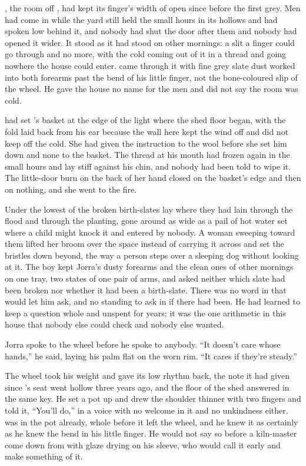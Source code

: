 
, the room off , had kept its finger's width of open since before the first grey. Men had come in while the yard still held the small hours in its hollows and had spoken low behind it, and nobody had shut the door after them and nobody had opened it wider. It stood as it had stood on other mornings: a slit a finger could go through and no more, with the cold coming out of it in a thread and going nowhere the house could enter.  came through it with fine grey slate dust worked into both forearms past the bend of his little finger, not the bone-coloured slip of the wheel. He gave the house no name for the men and did not say the room was cold.

 had set 's basket at the edge of the light where the shed floor began, with the fold laid back from his ear because the wall here kept the wind off and did not keep off the cold. She had given the instruction to the wool before she set him down and none to the basket. The thread at his mouth had frozen again in the small hours and lay stiff against his chin, and nobody had been told to wipe it. The little-door burn on the back of her hand closed on the basket's edge and then on nothing, and she went to the fire.

Under the lowest of  the broken birth-slates lay where they had lain through the flood and through the planting, gone around as wide as a pail of hot water set where a child might knock it and entered by nobody. A woman sweeping toward them lifted her broom over the space instead of carrying it across and set the bristles down beyond, the way a person steps over a sleeping dog without looking at it. The boy kept Jorra's dusty forearms and the clean ones of other mornings on one tray, two states of one pair of arms, and asked neither which slate had been broken nor whether it had been a birth-slate. There was no word in  that would let him ask, and no standing to ask in if there had been. He had learned to keep a question whole and unspent for years; it was the one arithmetic in this house that nobody else could check and nobody else wanted.

Jorra spoke to the wheel before he spoke to anybody. “It doesn't care whose hands,” he said, laying his palm flat on the worn rim. “It cares if they're steady.”

The wheel took his weight and gave its low rhythm back, the note it had given since 's seat went hollow three years ago, and the floor of the shed answered in the same key. He set a pot up and drew the shoulder thinner with two fingers and told it, “You'll do,” in a voice with no welcome in it and no unkindness either.  was in the pot already, whole before it left the wheel, and he knew it as certainly as he knew the bend in his little finger. He would not say so before a kiln-master come down from  with glaze drying on his sleeve, who would call it early and make something of it.

